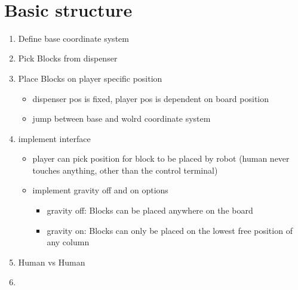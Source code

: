 \documentclass{article}
\begin{document}
  \makeHeader\
  \newpage
  \tableofcontents
  \newpage
  \section{Basic structure}
  \begin{enumerate}
    \item Define base coordinate system
    \item Pick Blocks from dispenser 
    \item Place Blocks on player specific position
    \begin{itemize}
      \item dispenser pos is fixed, player pos is dependent on board position
      \item jump between base and wolrd coordinate system
    \end{itemize}
    \item implement interface
    \begin{itemize}
      \item player can pick position for block to be placed by robot (human never touches anything, other than the control terminal)
      \item implement gravity off and on options
      \begin{itemize}
        \item gravity off: Blocks can be placed anywhere on the board
        \item gravity on: Blocks can only be placed on the lowest free position of any column
      \end{itemize}
    \end{itemize}
    \item Human vs Human 
    \item 
  \end{enumerate}
\end{document}
